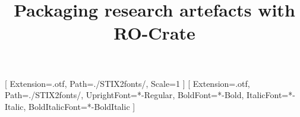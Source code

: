 \documentclass[ds]{iosart2x}
\begin{document}
[
    Extension={.otf},
    Path=./STIX2fonts/,
    Scale=1
]
\setmainfont{STIX2Text}[
    Extension={.otf},
    Path=./STIX2fonts/,
    UprightFont={*-Regular},
    BoldFont={*-Bold},
    ItalicFont={*-Italic},
    BoldItalicFont={*-BoldItalic}
]


\begin{frontmatter}

\title{Packaging research artefacts with RO-Crate}



\end{frontmatter}
\end{document}
